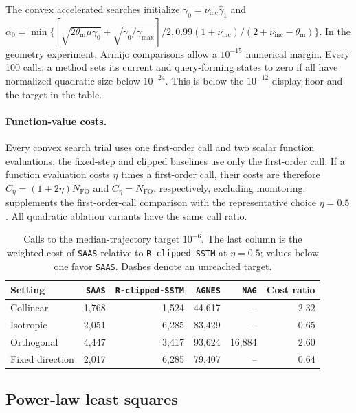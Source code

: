 \documentclass{article}
\begin{document}
The convex accelerated searches initialize
\(\gamma_0=\nu_{\mathrm{inc}}\hat\gamma_1\) and
\(\alpha_0=\min\{[\sqrt{2\theta_{\mathrm m}\mu\gamma_0}
+\sqrt{\gamma_0/\gamma_{\max}}]/2,
0.99(1+\nu_{\mathrm{inc}})/(2+\nu_{\mathrm{inc}}-\theta_{\mathrm m})\}\).
In the geometry experiment, Armijo comparisons allow a \(10^{-15}\)
numerical margin. Every 100
calls, a method sets its current and query-forming states to zero if
all have normalized quadratic size below \(10^{-24}\). This is below
the \(10^{-12}\) display floor and the target in the table.
\paragraph{Function-value costs.}
Every convex search trial uses one first-order call and two scalar
function evaluations; the fixed-step and clipped baselines use only
the first-order call. If a function evaluation costs \(\eta\) times
a first-order call, their costs are therefore
\(C_\eta=(1+2\eta)N_{\mathrm{FO}}\) and
\(C_\eta=N_{\mathrm{FO}}\), respectively, excluding monitoring.
 supplements the first-order-call
comparison with the representative choice \(\eta=0.5\).
All quadratic ablation variants have the same call ratio.

\begin{table}[H]
\centering
\caption{Calls to the median-trajectory target \(10^{-6}\).
The last column is the weighted cost of \texttt{SAAS} relative to
\texttt{R-clipped-SSTM} at \(\eta=0.5\); values below one favor
\texttt{SAAS}. Dashes denote an unreached target.}
\label{tab:exp_weighted_target_costs}

\small
\setlength{\tabcolsep}{5pt}
\begin{tabular*}{\linewidth}{@{\extracolsep{\fill}}lrrrrr@{}}
\toprule
Setting & \texttt{SAAS} & \texttt{R-clipped-SSTM} & \texttt{AGNES} & \texttt{NAG} & Cost ratio\\
\midrule
Collinear & 1,768 & 1,524 & 44,617 & -- & 2.32\\
Isotropic & 2,051 & 6,285 & 83,429 & -- & 0.65\\
Orthogonal & 4,447 & 3,417 & 93,624 & 16,884 & 2.60\\
Fixed direction & 2,017 & 6,285 & 79,407 & -- & 0.64\\
\bottomrule
\end{tabular*}
\end{table}

\subsection{Power-law least squares}
\label{app:exp_powerlaw_ls}
\end{document}
